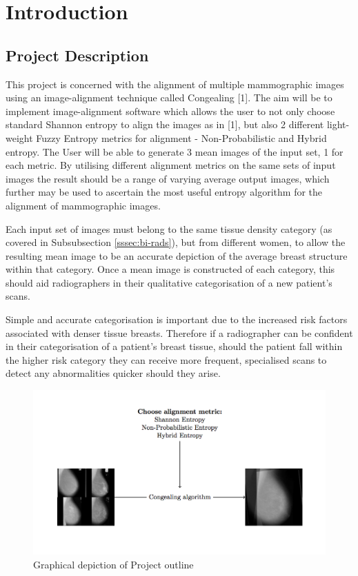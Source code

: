 \chapter{Introduction}

\section{Project Description}
This project is concerned with the alignment of multiple mammographic images using an image-alignment technique called Congealing [1]. The aim will be to implement image-alignment software which allows the user to not only choose standard Shannon entropy to align the images as in [1], but also 2 different light-weight Fuzzy Entropy metrics for alignment - Non-Probabilistic and Hybrid entropy. The User will be able to generate 3 mean images of the input set, 1 for each metric. By utilising different alignment metrics on the same sets of input images the result should be a range of varying average output images, which further may be used to ascertain the most useful entropy algorithm for the alignment of mammographic images.

Each input set of images must belong to the same tissue density category (as covered in Subsubsection \ref{sssec:bi-rads}), but from different women, to allow the resulting mean image to be an accurate depiction of the average breast structure within that category. Once a mean image is constructed of each category, this should aid radiographers in their qualitative categorisation of a new patient's scans.

Simple and accurate categorisation is important due to the increased risk factors associated with denser tissue breasts. Therefore if a radiographer can be confident in their categorisation of a patient's breast tissue, should the patient fall within the higher risk category they can receive more frequent, specialised scans to detect any abnormalities quicker should they arise.

\begin{figure}[H]
  \center
    \includegraphics{Introduction/diagram/diagram.png}
    \caption{Graphical depiction of Project outline}
    \label{fig:project-desc-img}
\end{figure}



